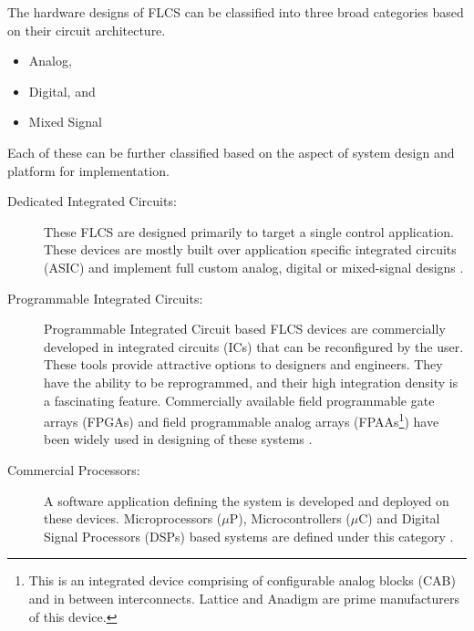 The hardware designs of FLCS can be classified into three broad categories based on their circuit architecture.
\begin{itemize}
	\item Analog, 
	\item Digital, and  
	\item Mixed Signal
\end{itemize}
Each of these can be further classified based on the aspect of system design and platform for implementation. 
\begin{description}
	\item[Dedicated Integrated Circuits:] These FLCS are designed primarily to target a single control application. These devices are mostly built over application specific integrated circuits (ASIC) and implement full custom analog, digital or mixed-signal designs \cite{Idros2014,Matsumoto2014,Li1997,Gomariz1998,Malek2008,Costa1995}.
	\item[Programmable Integrated Circuits:] Programmable Integrated Circuit based FLCS devices are commercially developed in integrated circuits (ICs) that can be reconfigured by the user. These tools provide attractive options to designers and engineers. They have the ability to be reprogrammed, and their high integration density is a fascinating feature. Commercially available field programmable gate arrays (FPGAs) and field programmable analog arrays (FPAAs\footnote{This is an integrated device comprising of configurable analog blocks (CAB) and in between interconnects. Lattice and Anadigm are prime manufacturers of this device.}) have been widely used in designing of these systems \cite{Guajardo2007,Sun2015a,Monmasson2007,Cecati2010,Palakeerthi2014,Jabeen2008,Tran2015,Pierzchala1998}.
	\item[Commercial Processors:] A software application defining the system is developed and deployed on these devices. Microprocessors ($\mu$P), Microcontrollers ($\mu$C) and Digital Signal Processors (DSPs) based systems are defined under this category \cite{Santoso2014,Youness2014a,Kurniawan2015,Yousef2015,Jia2011,Oswald2014,Selvaperumal2014}.
\end{description}

